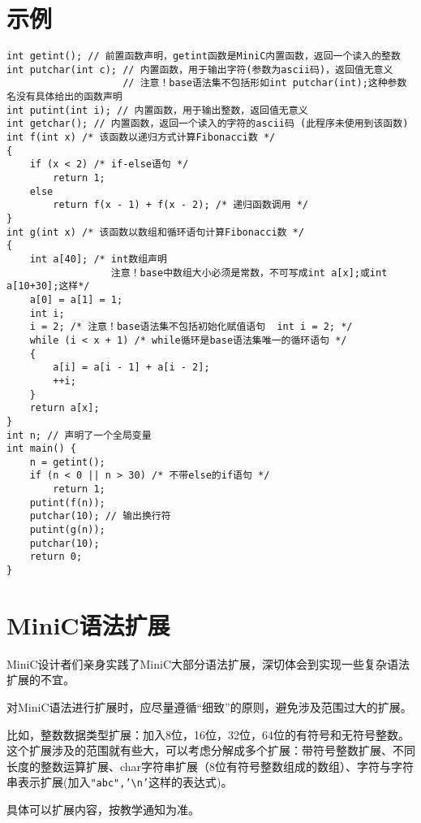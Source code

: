 \documentclass{ctexart}
\begin{document}
\section{示例}
\small
\begin{verbatim}
int getint(); // 前置函数声明，getint函数是MiniC内置函数，返回一个读入的整数
int putchar(int c); // 内置函数，用于输出字符(参数为ascii码)，返回值无意义
                    // 注意！base语法集不包括形如int putchar(int);这种参数名没有具体给出的函数声明
int putint(int i); // 内置函数，用于输出整数，返回值无意义
int getchar(); // 内置函数，返回一个读入的字符的ascii码 (此程序未使用到该函数)
int f(int x) /* 该函数以递归方式计算Fibonacci数 */
{
    if (x < 2) /* if-else语句 */
        return 1;
    else
        return f(x - 1) + f(x - 2); /* 递归函数调用 */
}
int g(int x) /* 该函数以数组和循环语句计算Fibonacci数 */
{
    int a[40]; /* int数组声明
                  注意！base中数组大小必须是常数，不可写成int a[x];或int a[10+30];这样*/
    a[0] = a[1] = 1;
    int i;
    i = 2; /* 注意！base语法集不包括初始化赋值语句  int i = 2; */
    while (i < x + 1) /* while循环是base语法集唯一的循环语句 */
    {
        a[i] = a[i - 1] + a[i - 2];
        ++i;
    }
    return a[x];
}
int n; // 声明了一个全局变量
int main() {
    n = getint();
    if (n < 0 || n > 30) /* 不带else的if语句 */
        return 1;
    putint(f(n));
    putchar(10); // 输出换行符
    putint(g(n));
    putchar(10);
    return 0;
}
\end{verbatim}
\newpage
\normalsize
\section{MiniC语法扩展}
MiniC设计者们亲身实践了MiniC大部分语法扩展，深切体会到实现一些复杂语法扩展的不宜。

对MiniC语法进行扩展时，应尽量遵循“细致”的原则，避免涉及范围过大的扩展。

比如，整数数据类型扩展：加入8位，16位，32位，64位的有符号和无符号整数。这个扩展涉及的范围就有些大，可以考虑分解成多个扩展：带符号整数扩展、不同长度的整数运算扩展、char字符串扩展（8位有符号整数组成的数组）、字符与字符串表示扩展(加入\texttt{"abc",'\textbackslash n'}这样的表达式)。

具体可以扩展内容，按教学通知为准。
\end{document}
